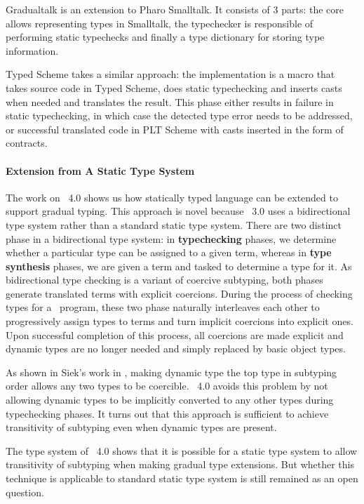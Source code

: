 Gradualtalk is an extension to Pharo Smalltalk. It consists of 3 parts:
the core allows representing types in Smalltalk, the typechecker
is responsible of performing static typechecks and finally
a type dictionary for storing type information.

Typed Scheme takes a similar approach: the implementation is a macro
that takes source code in Typed Scheme, does static typechecking and
inserts casts when needed and translates the result.
This phase either results in failure in static typechecking, in
which case the detected type error needs to be addressed,
or successful translated code in PLT Scheme with casts inserted
in the form of contracts.

\paragraph{Extension from A Static Type System}

The work on \csharp\ 4.0 shows us how statically typed language can be extended
to support gradual typing.
This approach is novel because \csharp\ 3.0 uses a bidirectional type system \cite{pierce2000local}
rather than a standard static type system.
There are two distinct phase in a bidirectional type system:
in \textbf{typechecking} phases, we determine whether a particular type can be
assigned to a given term, whereas in \textbf{type synthesis} phases,
we are given a term and tasked to determine a type for it.
As bidirectional type checking is a variant of coercive subtyping\cite{breazu1991inheritance},
both phases generate translated terms with explicit coercions.
During the process of checking types for a \csharp\ program,
these two phase naturally interleaves each other to progressively
assign types to terms and turn implicit coercions into explicit ones.
Upon successful completion of this process, all coercions are made
explicit and dynamic types are no longer needed and simply replaced by basic object types.

As shown in Siek's work in \cite{siek2007gradual},
making dynamic type the top type in subtyping order allows any two types to
be coercible. \csharp\ 4.0 avoids this problem by
not allowing dynamic types to be implicitly converted to any other types
during typechecking phases.
It turns out that this approach is sufficient to achieve
transitivity of subtyping
even when dynamic types are present.

The type system of \csharp\ 4.0 shows that it is possible for a
static type system to allow transitivity of subtyping when making gradual type extensions.
But whether this technique is applicable to standard static type system is still remained
as an open question.

